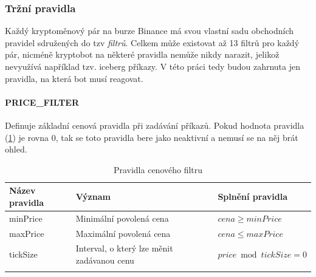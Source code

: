 

\subsubsection{Tržní pravidla}
Každý kryptoměnový pár na burze Binance má svou vlastní sadu obchodních pravidel sdružených do tzv \emph{filtrů}. Celkem může existovat až 13 filtrů pro každý pár, nicméně kryptobot na některé
pravidla nemůže nikdy narazit, jelikož nevyužívá například tzv. iceberg příkazy. V této práci tedy budou zahrnuta jen pravidla, na která bot musí reagovat.


\paragraph*{PRICE\_FILTER}
Definuje základní cenová pravidla při zadávání příkazů. Pokud hodnota pravidla (\ref{tab:binance:price_filter}) je rovna 0, tak se toto pravidla bere jako neaktivní a nemusí se na něj brát ohled.
\begin{center}
    \begin{longtable}[h]{|l|l|l|}
        \hline
        Název pravidla & Význam                                     & Splnění pravidla           \\
        \hline
        minPrice       & Minimální povolená cena                    & $ cena \geq  minPrice $    \\
        \hline
        maxPrice       & Maximální povolená cena                    & $ cena \leq maxPrice $     \\
        \hline
        tickSize       & Interval, o který lze měnit zadávanou cenu & $price \bmod tickSize = 0$ \\
        \hline
        \caption{Pravidla cenového filtru}
        \label{tab:binance:price_filter}
    \end{longtable}
\end{center}


